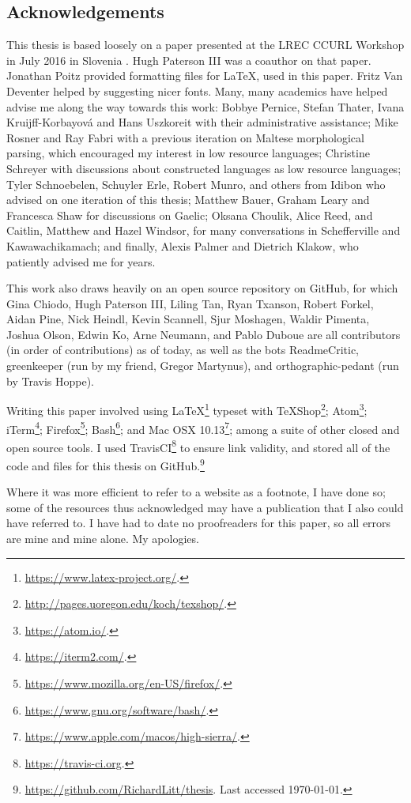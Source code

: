 \newpage
\thispagestyle{empty}
\noindent\subsection*{Acknowledgements}

This thesis is based loosely on a paper presented at the LREC CCURL Workshop in July 2016 in Slovenia \citep{CCURL}. Hugh Paterson III was a coauthor on that paper. Jonathan Poitz provided formatting files for \LaTeX, used in this paper. Fritz Van Deventer helped by suggesting nicer fonts. Many, many academics have helped advise me along the way towards this work: Bobbye Pernice, Stefan Thater, Ivana Kruijff-Korbayov\'a and Hans Uszkoreit with their administrative assistance; Mike Rosner and Ray Fabri with a previous iteration on Maltese morphological parsing, which encouraged my interest in low resource languages; Christine Schreyer with discussions about constructed languages as low resource languages; Tyler Schnoebelen, Schuyler Erle, Robert Munro, and others from Idibon who advised on one iteration of this thesis; Matthew Bauer, Graham Leary and Francesca Shaw for discussions on Gaelic; Oksana Choulik, Alice Reed, and Caitlin, Matthew and Hazel Windsor, for many conversations in Schefferville and Kawawachikamach; and finally, Alexis Palmer and Dietrich Klakow, who patiently advised me for years.

This work also draws heavily on an open source repository on GitHub, for which Gina Chiodo, Hugh Paterson III, Liling Tan, Ryan Txanson, Robert Forkel, Aidan Pine, Nick Heindl, Kevin Scannell, Sjur Moshagen, Waldir Pimenta, Joshua Olson, Edwin Ko, Arne Neumann, and Pablo Duboue are all contributors (in order of contributions) as of today, as well as the bots ReadmeCritic, greenkeeper (run by my friend, Gregor Martynus), and orthographic-pedant (run by Travis Hoppe).

Writing this paper involved using LaTeX\footnote{\href{https://www.latex-project.org/}{https://www.latex-project.org/}. } typeset with TeXShop\footnote{\href{http://pages.uoregon.edu/koch/texshop/}{http://pages.uoregon.edu/koch/texshop/}. }; Atom\footnote{\href{https://atom.io/}{https://atom.io/}. }; iTerm\footnote{\href{https://iterm2.com/}{https://iterm2.com/}. }; Firefox\footnote{\href{https://www.mozilla.org/en-US/firefox/}{https://www.mozilla.org/en-US/firefox/}. }; Bash\footnote{\href{https://www.gnu.org/software/bash/}{https://www.gnu.org/software/bash/}. }; and Mac OSX 10.13\footnote{\href{https://www.apple.com/macos/high-sierra/}{https://www.apple.com/macos/high-sierra/}. }; among a suite of other closed and open source tools. I used TravisCI\footnote{\href{https://travis-ci.org}{https://travis-ci.org}. } to ensure link validity, and stored all of the code and files for this thesis on GitHub.\footnote{\href{https://github.com/RichardLitt/thesis}{https://github.com/RichardLitt/thesis}. Last accessed \today.}

Where it was more efficient to refer to a website as a footnote, I have done so; some of the resources thus acknowledged may have a publication that I also could have referred to. I have had to date no proofreaders for this paper, so all errors are mine and mine alone. My apologies.